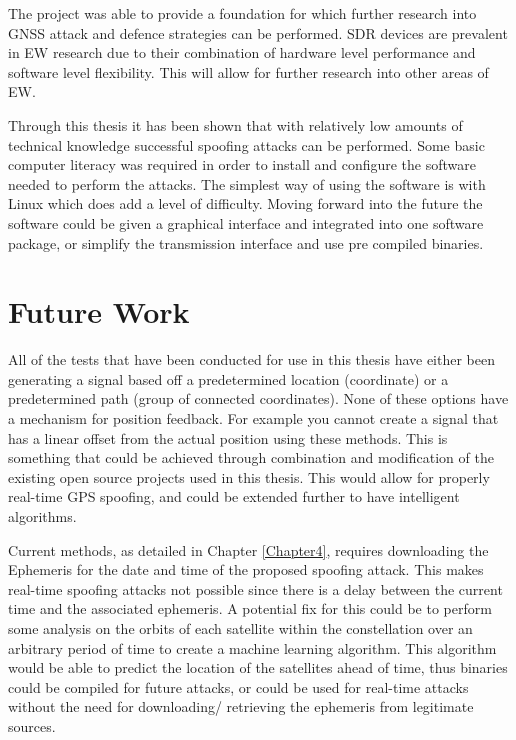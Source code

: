 \bigskip

The project was able to provide a foundation for which further research into GNSS attack and defence strategies can be
performed. SDR devices are prevalent in EW research due to their combination of hardware level performance and software level flexibility. This will allow for further
research into other areas of EW.

\bigskip

Through this thesis it has been shown that with relatively low amounts of technical knowledge successful spoofing attacks can be performed. Some basic computer literacy
was required in order to install and configure the software needed to perform the attacks. The simplest way of using the software is with Linux which does add a level of
difficulty.
Moving forward into the future the software could be given a graphical interface and integrated into one software package, or simplify the transmission interface and use
pre compiled binaries.

\section{Future Work}
All of the tests that have been conducted for use in this thesis have either been generating a signal based off a predetermined location (coordinate) or a predetermined
path (group of connected coordinates). None of these options have a mechanism for position feedback. For example you cannot create a signal that has a linear offset from
the actual position using these methods. This is something that could be achieved through combination and modification of the existing open source projects used in this
thesis. This would allow for properly real-time GPS spoofing, and could be extended further to have intelligent algorithms.

Current methods, as detailed in Chapter \ref{Chapter4}, requires downloading the Ephemeris for the date and time of the proposed spoofing attack. This makes real-time spoofing
attacks not possible since there is a delay between the current time and the associated ephemeris. A potential fix for this could be to perform some analysis on the
orbits of each satellite within the constellation over an arbitrary period of time to create a machine learning algorithm. This algorithm would be able to predict the
location of the satellites ahead of time, thus binaries could be compiled for future attacks, or could be used for real-time attacks without the need for downloading/
retrieving the ephemeris from legitimate sources.

